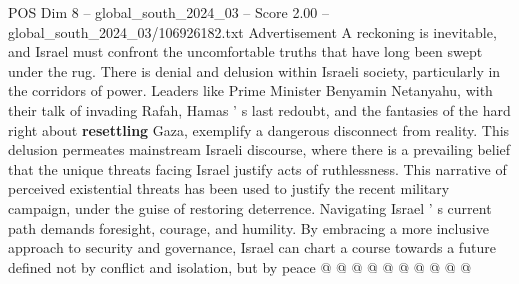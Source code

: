 \begin{textsample}{POS Dim 8 – global\_south\_2024\_03 – Score 2.00 – global\_south\_2024\_03/106926182.txt}
Advertisement A reckoning is inevitable, and Israel must confront the uncomfortable truths that have long been swept under the rug.
There is denial and delusion within Israeli society, particularly in the corridors of power.
Leaders like Prime Minister Benyamin Netanyahu, with their talk of invading Rafah, Hamas ' s last redoubt, and the fantasies of the hard right about \textbf{resettling} Gaza, exemplify a dangerous disconnect from reality.
This delusion permeates mainstream Israeli discourse, where there is a prevailing belief that the unique threats facing Israel justify acts of ruthlessness.
This narrative of perceived existential threats has been used to justify the recent military campaign, under the guise of restoring deterrence.
Navigating Israel ' s current path demands foresight, courage, and humility.
By embracing a more inclusive approach to security and governance, Israel can chart a course towards a future defined not by conflict and isolation, but by peace @ @ @ @ @ @ @ @ @ @

\end{textsample}

